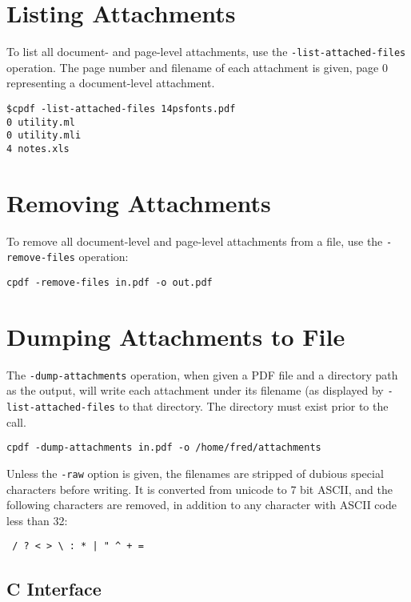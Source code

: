 \documentclass{book}
\begin{document}
\section{Listing Attachments}
To list all document- and page-level attachments, use the \texttt{-list-attached-files} operation. The page number and filename of each attachment is given, page 0 representing a document-level attachment.
\begin{framed}
{\small\begin{verbatim}
$cpdf -list-attached-files 14psfonts.pdf
0 utility.ml
0 utility.mli
4 notes.xls
\end{verbatim}}
\end{framed}

  \section{Removing Attachments}
   To remove all document-level and page-level attachments from a file, use the \texttt{-remove-files} operation:
  \begin{framed}
    \small\verb!cpdf -remove-files in.pdf -o out.pdf!
  \end{framed}

\section{Dumping Attachments to File}

The \texttt{-dump-attachments} operation, when given a PDF file and a directory path as the output, will write each attachment under its filename (as displayed by \texttt{-list-attached-files} to that directory. The directory must exist prior to the call.

  \begin{framed}
    \small\verb!cpdf -dump-attachments in.pdf -o /home/fred/attachments!
  \end{framed}

\noindent  Unless the \texttt{-raw} option is given, the filenames are stripped of dubious special characters before writing. It is converted from unicode to 7 bit ASCII, and the following characters are removed, in addition to any character with ASCII code less than 32:
  \begin{framed}
  \centering
  \verb! / ? < > \ : * | " ^ + =!
  \end{framed}

\begin{cpdflib}
\clearpage
\section*{C Interface}
\begin{small}\tt

\end{small}
\end{cpdflib}
\end{document}

